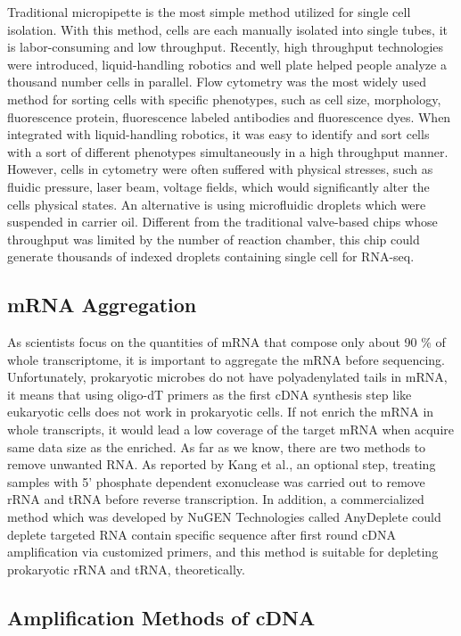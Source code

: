 \documentclass[fleqn,10pt]{wlscirep}
\begin{document}
Traditional micropipette is the most simple method utilized for single cell isolation. With this method, cells are each manually isolated into single tubes, it is labor-consuming and low throughput. Recently, high throughput technologies were introduced, liquid-handling robotics and well plate helped people analyze a thousand number cells in parallel. Flow cytometry was the most widely used method for sorting cells with specific phenotypes, such as cell size, morphology, fluorescence protein, fluorescence labeled antibodies and fluorescence dyes. When integrated with liquid-handling robotics, it was easy to identify and sort cells with a sort of different phenotypes simultaneously in a high throughput manner. However, cells in cytometry were often suffered with physical stresses, such as fluidic pressure, laser beam, voltage fields, which would significantly alter the cells physical states. An alternative is using microfluidic droplets which were suspended in carrier oil. Different from the traditional valve-based chips\cite{Klein2015} whose throughput was limited by the number of reaction chamber, this chip could generate thousands of indexed droplets containing single cell for RNA-seq\cite{Klein2015}.

\subsection[]{mRNA Aggregation}
As scientists focus on the quantities of mRNA that compose only about 90 \% of whole transcriptome, it is important to aggregate the mRNA before sequencing. Unfortunately, prokaryotic microbes do not have polyadenylated tails in mRNA, it means that using oligo-dT primers as the first cDNA synthesis step like eukaryotic cells does not work in prokaryotic cells. If not enrich the mRNA in whole transcripts, it would lead a low coverage of the target mRNA when acquire same data size as the enriched. As far as we know, there are two methods to remove unwanted RNA. As reported by Kang et al.\cite{Kang2011}, an optional step, treating samples with 5’ phosphate dependent exonuclease was carried out to remove rRNA and tRNA before reverse transcription. In addition, a commercialized method which was developed by NuGEN Technologies called AnyDeplete could deplete targeted RNA contain specific sequence after first round cDNA amplification via customized primers, and this method is suitable for depleting prokaryotic rRNA and tRNA, theoretically.

\subsection[]{Amplification Methods of cDNA}
\end{document}

